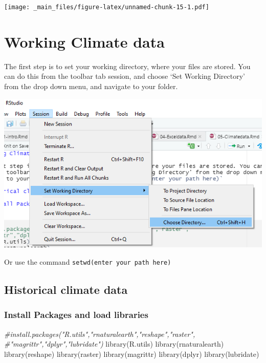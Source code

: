 \documentclass[
]{book}
\newenvironment{Shaded}{\begin{snugshade}}{\end{snugshade}}
\newcommand{\CommentTok}[1]{\textcolor[rgb]{0.56,0.35,0.01}{\textit{#1}}}
\newcommand{\FunctionTok}[1]{\textcolor[rgb]{0.00,0.00,0.00}{#1}}
\newcommand{\NormalTok}[1]{#1}
\let\origfigure\figure
\let\endorigfigure\endfigure
\renewenvironment{figure}[1][2] {
    \expandafter\origfigure\expandafter[H]
} {
    \endorigfigure
}
\begin{document}
\texttt{[image: \_main\_files/figure-latex/unnamed-chunk-15-1.pdf]}

\hypertarget{working-climate-data}{%
\chapter{Working Climate data}\label{working-climate-data}}

The first step is to set your working directory, where your files are stored. You can do this from the toolbar tab session, and choose `Set Working Directory' from the drop down menu, and navigate to your folder.

\begin{figure}
\centering
\includegraphics{tutorial_screenshots/setwd.png}
\caption{setwd}
\end{figure}

Or use the command \texttt{setwd(enter\ your\ path\ here)}

\hypertarget{historical-climate-data}{%
\section{Historical climate data}\label{historical-climate-data}}

\hypertarget{install-packages-and-load-libraries}{%
\subsection{Install Packages and load libraries}\label{install-packages-and-load-libraries}}

\begin{Shaded}
\begin{Highlighting}[]
\CommentTok{\#install.packages("R.utils","rnaturalearth","reshape","raster",}
\CommentTok{\#"magrittr","dplyr","lubridate")}
\FunctionTok{library}\NormalTok{(R.utils)}
\FunctionTok{library}\NormalTok{(rnaturalearth)}
\FunctionTok{library}\NormalTok{(reshape)}
\FunctionTok{library}\NormalTok{(raster)}
\FunctionTok{library}\NormalTok{(magrittr)}
\FunctionTok{library}\NormalTok{(dplyr)}
\FunctionTok{library}\NormalTok{(lubridate)}
\end{Highlighting}
\end{Shaded}
\end{document}
